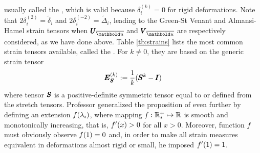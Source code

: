 usually called the , which is valid because $\delta_i^{(k)}=0$ for rigid deformations. Note that $2\delta_i^{(2)}=\tilde{\delta}_i$ and $2\delta_i^{(-2)}=\tilde{\Delta}_i$, leading to the Green-St Venant and Almansi-Hamel strain tensors when $\tnr{U}_{\overline{\vto{u}}}$ and $\tnr{V}_{\overline{\vto{u}}}$ are respectively considered, as we have done above. Table \ref{tb:strains} lists the most common strain tensors available, called the . For $k\neq 0$, they are based on the generic strain tensor 
\begin{equation}
\pmb{E}_{\pmb{S}}^{(k)}:=\dfrac{1}{k}(\pmb{S}^k-\pmb{I})
\end{equation}
where tensor $\pmb{S}$ is a positive-definite symmetric tensor equal to or defined from the stretch tensors. Professor \cite{hill_1968_1} generalized the proposition of \cite{seth_1961} even further by defining an extension $f(\lambda_i)$, where mapping $f : \mathbb{R}^+_* \mapsto \mathbb{R}$ is smooth and monotonically increasing, that is, $f'(x)>0$ for all $x>0$. Moreover, function $f$ must obviously observe $f(1)=0$ and, in order to make all strain measures equivalent in deformations almost rigid or small, he imposed $f'(1)=1$.

